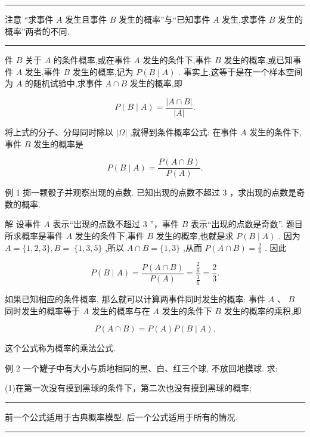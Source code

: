 \documentclass[10pt]{article}
\newcommand{\HRule}{\begin{center}\rule{0.9\linewidth}{0.2mm}\end{center}}
\begin{document}
\HRule

注意 “求事件 \(A\) 发生且事件 \(B\) 发生的概率”与“已知事件 \(A\) 发生,求事件 \(B\) 发生的概率”两者的不同.

\HRule

件 \(B\) 关于 \(A\) 的条件概率,或在事件 \(A\) 发生的条件下,事件 \(B\) 发生的概率,或已知事件 \(A\) 发生,事件 \(B\) 发生的概率,记为 \(P\left( {B \mid  A}\right)\) . 事实上,这等于是在一个样本空间为 \(A\) 的随机试验中,求事件 \(A \cap  B\) 发生的概率,即

\[
P\left( {B \mid  A}\right)  = \frac{\left| A \cap  B\right| }{\left| A\right| }.
\]

将上式的分子、分母同时除以 \(\left| \Omega \right|\) ,就得到条件概率公式: 在事件 \(A\) 发生的条件下,事件 \(B\) 发生的概率是

\[
P\left( {B \mid  A}\right)  = \frac{P\left( {A \cap  B}\right) }{P\left( A\right) }.
\]

例 1 掷一颗骰子并观察出现的点数. 已知出现的点数不超过 3 ，求出现的点数是奇数的概率.

解 设事件 \(A\) 表示“出现的点数不超过 3 ”，事件 \(B\) 表示“出现的点数是奇数”. 题目所求概率是事件 \(A\) 发生的条件下,事件 \(B\) 发生的概率,也就是求 \(P\left( {B \mid  A}\right)\) . 因为 \(A = \{ 1,2,3\} ,B = \; \{ 1,3,5\}\) ,所以 \(A \cap  B = \{ 1,3\}\) ,从而 \(P\left( {A \cap  B}\right)  = \frac{2}{6}\) . 因此

\[
P\left( {B \mid  A}\right)  = \frac{P\left( {A \cap  B}\right) }{P\left( A\right) } = \frac{\frac{2}{6}}{\frac{3}{6}} = \frac{2}{3}.
\]

如果已知相应的条件概率, 那么就可以计算两事件同时发生的概率: 事件 \(A\text{ 、 }B\) 同时发生的概率等于 \(A\) 发生的概率与在 \(A\) 发生的条件下 \(B\) 发生的概率的乘积,即

\[
P\left( {A \cap  B}\right)  = P\left( A\right) P\left( {B \mid  A}\right) .
\]

这个公式称为概率的乘法公式.

例 2 一个罐子中有大小与质地相同的黑、白、红三个球, 不放回地摸球. 求:

(1)在第一次没有摸到黑球的条件下，第二次也没有摸到黑球的概率;



\HRule

前一个公式适用于古典概率模型, 后一个公式适用于所有的情况.

\HRule

\section*{}
\end{document}

